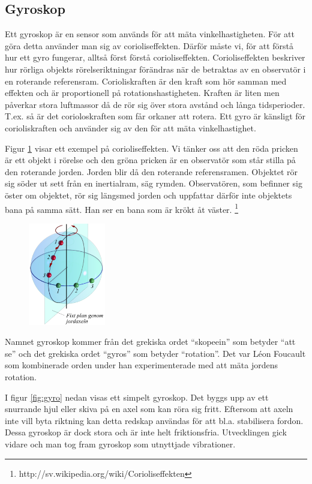 \documentclass[a4paper,12pt,fleqn]{article}
\begin{document}
\subsection{Gyroskop}
Ett gyroskop är en sensor som används för att mäta vinkelhastigheten. För att göra detta använder man sig av corioliseffekten. Därför måste vi, för att förstå hur ett gyro fungerar, alltså först förstå corioliseffekten. Corioliseffekten beskriver hur rörliga objekts rörelseriktningar förändras när de betraktas av en observatör i en roterande referensram. Corioliskraften är den kraft som hör samman med effekten och är proportionell på rotationshastigheten. Kraften är liten men påverkar stora luftmassor då de rör sig över stora avstånd och långa tidsperioder. T.ex. så är det corioloskraften som får orkaner att rotera. Ett gyro är känsligt för corioliskraften och använder sig av den för att mäta vinkelhastighet.

Figur \ref{fig:jord} visar ett exempel på corioliseffekten. Vi tänker oss att den röda pricken är ett objekt i rörelse och den gröna pricken är en observatör som står stilla på den roterande jorden. Jorden blir då den roterande referensramen. Objektet rör sig söder ut sett från en inertialram, säg rymden. Observatören, som befinner sig öster om objektet, rör sig längsmed jorden och uppfattar därför inte objektets bana på samma sätt. Han ser en bana som är krökt åt väster.
\footnote{http://sv.wikipedia.org/wiki/Corioliseffekten}


\begin{figure}[h]
\label{fig:jord}
\caption{}
\includegraphics[width=0.3\textwidth]
{Coriolisjord.png}
\end{figure}


Namnet  gyroskop kommer från det grekiska ordet “skopeein” som betyder “att se” och det grekiska ordet “gyros” som betyder “rotation”. Det var Léon Foucault som kombinerade orden under han experimenterade med att mäta jordens rotation.

I figur \ref{fig:gyro} nedan visas ett simpelt gyroskop. Det byggs upp av ett snurrande hjul eller skiva på en axel som kan röra sig fritt. Eftersom att axeln inte vill byta riktning kan detta redskap användas för att bl.a. stabilisera fordon. Dessa gyroskop är dock stora och är inte helt friktionsfria. Utvecklingen gick vidare och man tog fram gyroskop som utnyttjade vibrationer.
\end{document}
